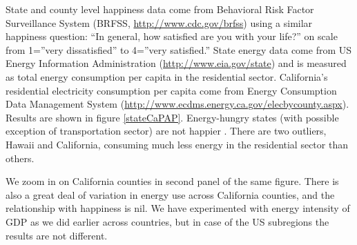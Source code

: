 \documentclass[10pt, letterpaper]{article}
\begin{document}
\begin{spacing}{1.4}
State and county level happiness data come from Behavioral Risk Factor
Surveillance System (BRFSS, \url{http://www.cdc.gov/brfss}) using a similar happiness question: ``In general,
how satisfied are you with your life?'' on scale 
from 1=''very dissatisfied'' to 4=''very satisfied.'' State energy  data come from
US Energy Information Administration (\url{http://www.eia.gov/state})  and is measured as total energy
consumption per capita in the residential sector.  
California's  residential electricity consumption per capita come from 
Energy Consumption Data Management System
(\url{http://www.ecdms.energy.ca.gov/elecbycounty.aspx}). Results are shown in
figure \ref{stateCaPAP}. Energy-hungry states (with possible exception of transportation sector) are not happier%
. There are two outliers, Hawaii and California, consuming much less energy in
the residential sector than others. 

We zoom in on California counties in
second panel of the same figure. There is also a great deal of variation in energy
use across California counties, and the relationship with happiness is nil. 
We have  experimented with energy intensity of
GDP as we did earlier across countries, but in case of the US subregions the results are
not different. %


\end{spacing}
\end{document}
